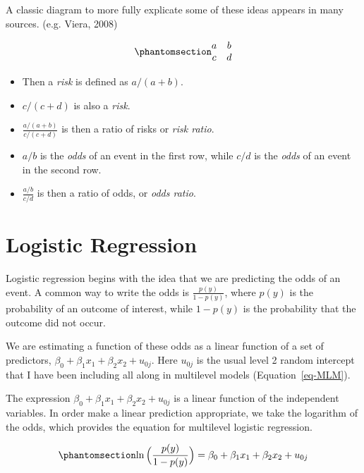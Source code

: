\documentclass[
  letterpaper,
  DIV=11,
  numbers=noendperiod]{scrreprt}
\begin{document}
A classic diagram to more fully explicate some of these ideas appears in
many sources. (e.g. Viera, 2008)

\begin{equation}\phantomsection\label{eq-event-matrix}{\begin{matrix}
a & b \\
c & d 
\end{matrix}}\end{equation}

\begin{itemize}
\item
  Then a \emph{risk} is defined as \(a/(a + b)\).
\item
  \(c/(c + d)\) is also a \emph{risk}.
\item
  \(\frac{a/(a + b)}{c/(c + d)}\) is then a ratio of risks or \emph{risk
  ratio}.
\item
  \(a/b\) is the \emph{odds} of an event in the first row, while \(c/d\)
  is the \emph{odds} of an event in the second row.
\item
  \(\frac{a/b}{c/d}\) is then a ratio of odds, or \emph{odds ratio}.
\end{itemize}

\section{Logistic Regression}\label{logistic-regression}

Logistic regression begins with the idea that we are predicting the odds
of an event. A common way to write the odds is \(\frac{p(y)}{1-p(y)}\),
where \(p(y)\) is the probability of an outcome of interest, while
\(1-p(y)\) is the probability that the outcome did not occur.

We are estimating a function of these odds as a linear function of a set
of predictors, \(\beta_0 + \beta_1 x_1 + \beta_2 x_2 + u_{0j}\). Here
\(u_{0j}\) is the usual level 2 random intercept that I have been
including all along in multilevel models (Equation~\ref{eq-MLM}).

The expression \(\beta_0 + \beta_1 x_1 + \beta_2 x_2 + u_{0j}\) is a
linear function of the independent variables. In order make a linear
prediction appropriate, we take the logarithm of the odds, which
provides the equation for multilevel logistic regression.

\begin{equation}\phantomsection\label{eq-logistic-MLM}{\ln\Big(\frac{p(y)}{1-p(y)}\Big) = \beta_0 + \beta_1 x_1 + \beta_2 x_2 + u_{0j}}\end{equation}
\end{document}

